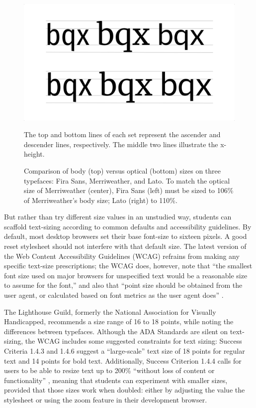 \documentclass[sigplan,screen]{acmart}
\begin{document}
\begin{figure}
  \includegraphics[width=\linewidth]{bvos}
  \caption{Comparison of body (top) versus optical (bottom) sizes on three typefaces: Fira Sans, Merriweather, and Lato. To match the optical size of Merriweather (center), Fira Sans (left) must be sized to 106\% of Merriweather's body size; Lato (right) to 110\%.} The top and bottom lines of each set represent the ascender and descender lines, respectively. The middle two lines illustrate the x-height.
  \label{fig:bvos}
\end{figure}


But rather than try different size values in an unstudied way, students can scaffold text-sizing according to common defaults and accessibility guidelines. By default, most desktop browsers set their base font-size to sixteen pixels. A good reset stylesheet should not interfere with that default size. The latest version of the Web Content Accessibility Guidelines (WCAG) refrains from making any specific text-size prescriptions; the WCAG does, however, note that “the smallest font size used on major browsers for unspecified text would be a reasonable size to assume for the font,” and also that “point size should be obtained from the user agent, or calculated based on font metrics as the user agent does” \cite{w3c:wcag}.

The Lighthouse Guild, formerly the National Association for Visually Handicapped, recommends a size range of 16 to 18 points, while noting the differences between typefaces\cite{lhg:mtl}. Although the ADA Standards are silent on text-sizing, the WCAG includes some suggested constraints for text sizing: Success Criteria 1.4.3 and 1.4.6 suggest a “large-scale” text size of 18 points for regular text and 14 points for bold text. Additionally, Success Criterion 1.4.4 calls for users to be able to resize text up to 200\% “without loss of content or functionality” \cite{w3c:wcag}, meaning that students can experiment with smaller sizes, provided that those sizes work when doubled: either by adjusting the value the stylesheet or using the zoom feature in their development browser.
\end{document}
